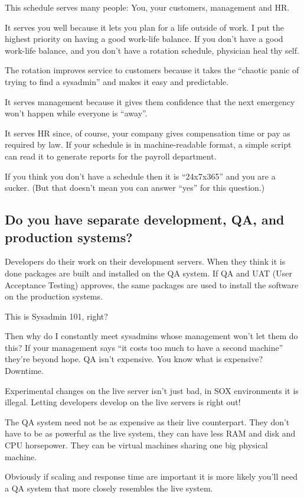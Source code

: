 \documentclass{article}
\begin{document}
This schedule serves many people: You, your customers, management and HR.

It serves you well because it lets you plan for a life outside of work. I put the highest priority on having a good work-life balance. If you don't have a good work-life balance, and you don't have a rotation schedule, physician heal thy self.

The rotation improves service to customers because it takes the ``chaotic panic of trying to find a sysadmin'' and makes it easy and predictable.

It serves management because it gives them confidence that the next emergency won't happen while everyone is ``away''.

It serves HR since, of course, your company gives compensation time or pay as required by law. If your schedule is in machine-readable format, a simple script can read it to generate reports for the payroll department.

If you think you don't have a schedule then it is ``24x7x365'' and you are a sucker. (But that doesn't mean you can answer ``yes'' for this question.)

\subsection{Do you have separate development, QA, and production systems?}
Developers do their work on their development servers. When they think it is done packages are built and installed on the QA system. If QA and UAT (User Acceptance Testing) approves, the same packages are used to install the software on the production systems.

This is Sysadmin 101, right?

Then why do I constantly meet sysadmins whose management won't let them do this? If your management says ``it costs too much to have a second machine'' they're beyond hope. QA isn't expensive. You know what is expensive? Downtime.

Experimental changes on the live server isn't just bad, in SOX environments it is illegal. Letting developers develop on the live servers is right out!

The QA system need not be as expensive as their live counterpart. They don't have to be as powerful as the live system, they can have less RAM and disk and CPU horsepower. They can be virtual machines sharing one big physical machine.

Obviously if scaling and response time are important it is more likely you'll need a QA system that more closely resembles the live system.
\end{document}
